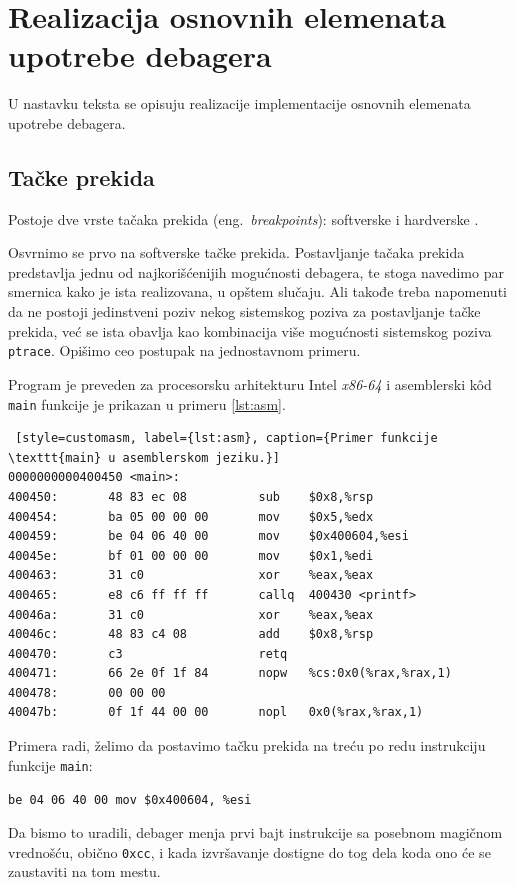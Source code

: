 \documentclass[12pt,oneside]{memoir}
\begin{document}
\section{Realizacija osnovnih elemenata upotrebe debagera}

U nastavku teksta se opisuju realizacije implementacije osnovnih elemenata upotrebe debagera.

\subsection{Tačke prekida}

Postoje dve vrste tačaka prekida (eng.~\emph{breakpoints}): softverske i hardverske \cite{GDB}.

Osvrnimo se prvo na softverske tačke prekida. Postavljanje tačaka prekida predstavlja jednu od najkorišćenijih mogućnosti debagera, te stoga navedimo par smernica kako je ista realizovana, u opštem slučaju. Ali takođe treba napomenuti da ne postoji jedinstveni poziv nekog sistemskog poziva za postavljanje tačke prekida, već se ista obavlja kao kombinacija više mogućnosti  sistemskog poziva \texttt{ptrace}. Opišimo ceo postupak na jednostavnom primeru.

Program je preveden za procesorsku arhitekturu Intel \emph{x86-64} i asemblerski k\^{o}d \texttt{main} funkcije je prikazan u primeru \ref{lst:asm}.
\begin{lstlisting} [style=customasm, label={lst:asm}, caption={Primer funkcije \texttt{main} u asemblerskom jeziku.}]
0000000000400450 <main>:
400450:       48 83 ec 08          sub    $0x8,%rsp
400454:       ba 05 00 00 00       mov    $0x5,%edx
400459:       be 04 06 40 00       mov    $0x400604,%esi
40045e:       bf 01 00 00 00       mov    $0x1,%edi
400463:       31 c0                xor    %eax,%eax
400465:       e8 c6 ff ff ff       callq  400430 <printf>
40046a:       31 c0                xor    %eax,%eax
40046c:       48 83 c4 08          add    $0x8,%rsp
400470:       c3                   retq   
400471:       66 2e 0f 1f 84       nopw   %cs:0x0(%rax,%rax,1)
400478:       00 00 00 
40047b:       0f 1f 44 00 00       nopl   0x0(%rax,%rax,1)

\end{lstlisting}


Primera radi, želimo da postavimo tačku prekida na treću po redu instrukciju funkcije \texttt{main}:

\texttt{be 04 06 40 00  mov \$0x400604, \%esi}

Da bismo to uradili, debager menja prvi bajt instrukcije sa posebnom magičnom vrednošću, obično \texttt{0xcc}, i kada izvršavanje dostigne do tog dela koda ono će se zaustaviti na tom mestu.
\end{document}
